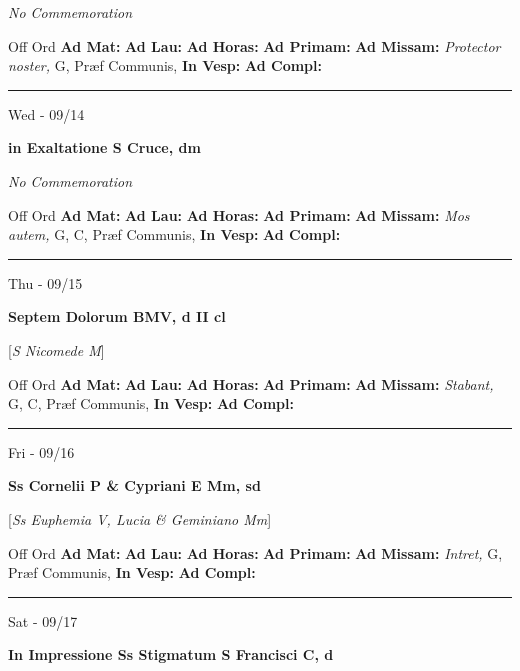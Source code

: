 \documentclass[letterpaper, 10pt]{article}
\begin{document}
\textit{No Commemoration}\begin{justify}
Off Ord
\textbf{Ad Mat: }
\textbf{Ad Lau: }
\textbf{Ad Horas: }
\textbf{Ad Primam: }
\textbf{Ad Missam:} \textit{Protector noster, } G, Præf Communis, 
\textbf{In Vesp: }
\textbf{Ad Compl: }\end{justify}



\hrule
\begin{center}
Wed - 09/14
\end{center}\textbf{ \large in Exaltatione S Cruce, \textnormal{\normalsize dm}}

\textit{No Commemoration}\begin{justify}
Off Ord
\textbf{Ad Mat: }
\textbf{Ad Lau: }
\textbf{Ad Horas: }
\textbf{Ad Primam: }
\textbf{Ad Missam:} \textit{Mos autem, } G, C, Præf Communis, 
\textbf{In Vesp: }
\textbf{Ad Compl: }\end{justify}



\hrule
\begin{center}
Thu - 09/15
\end{center}\textbf{ \large Septem Dolorum BMV, \textnormal{\normalsize d II cl}}

[\textit{S Nicomede M}]
\begin{justify}
Off Ord
\textbf{Ad Mat: }
\textbf{Ad Lau: }
\textbf{Ad Horas: }
\textbf{Ad Primam: }
\textbf{Ad Missam:} \textit{Stabant, } G, C, Præf Communis, 
\textbf{In Vesp: }
\textbf{Ad Compl: }\end{justify}



\hrule
\begin{center}
Fri - 09/16
\end{center}\textbf{ \large Ss Cornelii P \& Cypriani E Mm, \textnormal{\normalsize sd}}

[\textit{Ss Euphemia V, Lucia \& Geminiano Mm}]
\begin{justify}
Off Ord
\textbf{Ad Mat: }
\textbf{Ad Lau: }
\textbf{Ad Horas: }
\textbf{Ad Primam: }
\textbf{Ad Missam:} \textit{Intret, } G, Præf Communis, 
\textbf{In Vesp: }
\textbf{Ad Compl: }\end{justify}



\hrule
\begin{center}
Sat - 09/17
\end{center}\textbf{ \large In Impressione Ss Stigmatum S Francisci C, \textnormal{\normalsize d}}
\end{document}
